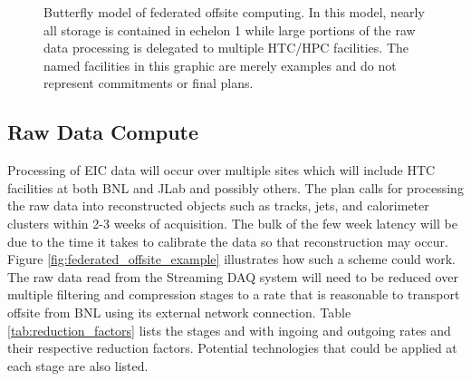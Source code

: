 \begin{figure}[hbt!]
 \begin{center}
  \caption[Federated Computing Butterfly model.]{\label{fig:federated_offsite_butterfly} Butterfly model of federated offsite computing. In this model, nearly all storage is contained in echelon 1 while large portions of the raw data processing is delegated to multiple HTC/HPC facilities. The named facilities in this graphic are merely examples and do not represent commitments or final plans.}
 \end{center}
\end{figure}

\subsection{Raw Data Compute}
Processing of EIC data will occur over multiple sites which will include HTC facilities at both BNL and JLab and possibly others. The plan calls for processing the raw data into reconstructed objects such as tracks, jets, and calorimeter clusters within 2-3 weeks of acquisition. The bulk of the few week latency will be due to the time it takes to calibrate the data so that reconstruction may occur. Figure \ref{fig:federated_offsite_example} illustrates how such a scheme could work. The raw data read from the Streaming DAQ system will need to be reduced over multiple filtering and compression stages to a rate that is reasonable to transport offsite from BNL using its external network connection. Table \ref{tab:reduction_factors} lists the stages and with ingoing and outgoing rates and their respective reduction factors. Potential technologies that could be applied at each stage are also listed.

